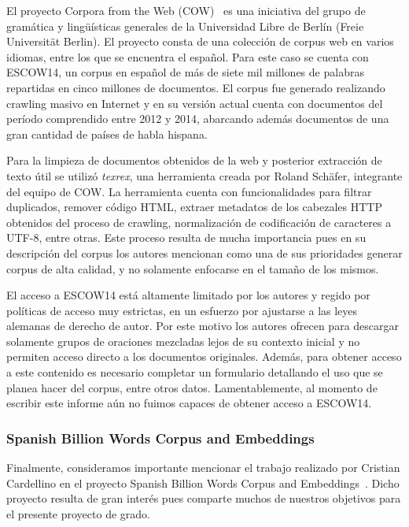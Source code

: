 El proyecto Corpora from the Web (COW)~\cite{CorporaFromTheWeb} es una iniciativa del grupo de gramática
y lingüísticas generales de la Universidad Libre de Berlín (Freie Universität Berlin). El proyecto consta
de una colección de corpus web en varios idiomas, entre los que se encuentra el español. Para este caso se
cuenta con ESCOW14, un corpus en español de más de siete mil millones de palabras repartidas en
cinco millones de documentos. El corpus fue generado realizando crawling masivo en Internet y en su
versión actual cuenta con documentos del período comprendido entre 2012 y 2014, abarcando además
documentos de una gran cantidad de países de habla hispana.

Para la limpieza de documentos obtenidos de la web y posterior extracción de texto útil se utilizó
\textit{texrex}, una herramienta creada por Roland Schäfer, integrante del equipo de COW. La herramienta
cuenta con funcionalidades para filtrar duplicados, remover código HTML, extraer metadatos de los cabezales
HTTP obtenidos del proceso de crawling, normalización de codificación de caracteres a UTF-8, entre
otras. Este proceso resulta de mucha importancia pues en su descripción del corpus los autores
mencionan como una de sus prioridades generar corpus de alta calidad, y no solamente enfocarse en el
tamaño de los mismos.

El acceso a ESCOW14 está altamente limitado por los autores y regido por políticas de acceso muy
estrictas, en un esfuerzo por ajustarse a las leyes alemanas de derecho de autor. Por este motivo
los autores ofrecen para descargar solamente grupos de oraciones mezcladas lejos de su contexto inicial
y no permiten acceso directo a los documentos originales. Además, para obtener acceso a este contenido
es necesario completar un formulario detallando el uso que se planea hacer del corpus, entre otros
datos. Lamentablemente, al momento de escribir este informe aún no fuimos capaces de obtener acceso
a ESCOW14.

\subsubsection{Spanish Billion Words Corpus and Embeddings}

Finalmente, consideramos importante mencionar el trabajo realizado por Cristian Cardellino en el proyecto
Spanish Billion Words Corpus and Embeddings~\cite{SBWCE}. Dicho proyecto resulta de gran interés pues
comparte muchos de nuestros objetivos para el presente proyecto de grado.

